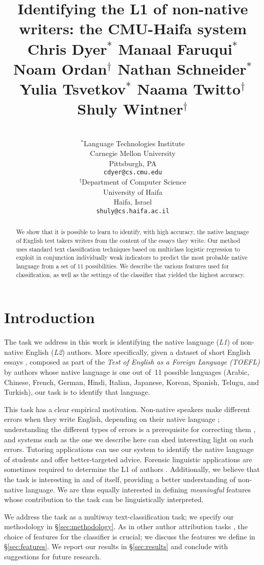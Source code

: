 \documentclass[11pt,letterpaper]{article}
\title{Identifying the L1 of non-native writers: the CMU-Haifa system\\[1em]
{\large Chris Dyer$^\ast$ Manaal Faruqui$^\ast$ Noam Ordan$^\dagger$ Nathan Schneider$^\ast$\\ Yulia Tsvetkov$^\ast$ Naama Twitto$^\dagger$ Shuly Wintner$^\dagger$}\\[-3em]
}
\author{
\\
$^\ast$Language Technologies Institute\\Carnegie Mellon University\\Pittsburgh, PA\\\texttt{cdyer@cs.cmu.edu}
\And
\\
$^\dagger$Department of Computer Science\\University of Haifa\\Haifa, Israel\\\texttt{shuly@cs.haifa.ac.il}
%
%
%
%
}
\date{}
\newcommand{\Sref}[1]{\S\ref{#1}}
\begin{document}
\maketitle
\begin{abstract}
We show that it is possible to learn to identify, with high accuracy, the native language of English test takers writers from the content of the essays they write.  Our method uses standard text classification
techniques based on multiclass logistic regression to exploit in conjunction individually weak indicators to predict the most probable native language from a set of 11 possibilities. We describe the various features
used for classification, as well as the settings of the classifier
that yielded the highest accuracy.
\end{abstract}

\section{Introduction}
\label{sec:intro}
The task we address in this work is identifying the native language
(\emph{L1}) of non-native English (\emph{L2}) authors. More specifically, given a
dataset of short English essays
\citep{blanchard-tetreault-higgins-cahill-chodorow:2013:TOEFL11-RR},
composed as part of the \emph{Test of English as a Foreign Language
  (TOEFL)} by authors whose native language is one out of~11 possible
languages (Arabic, Chinese, French, German, Hindi, Italian, Japanese,
Korean, Spanish, Telugu, and Turkish), our task is to identify that
language.

This task has a clear empirical motivation. Non-native speakers make
different errors when they write English, depending on their native
language \citep{swan2001learner}; understanding the different types of
errors is a prerequisite for correcting them
\citep{Leacock:2010:AGE:1855062}, and systems such as the one we
describe here can shed interesting light on such errors. Tutoring
applications can use our system to identify the native language of
students and offer better-targeted advice. Forensic linguistic
applications are sometimes required to determine the L1 of authors
\citep{estival-gaustad-pham-radford-hutchinson:2007:ALTA2007,estival2007author}. Additionally,
we believe that the task is interesting in and of itself, providing a
better understanding of non-native language. We are thus equally
interested in defining \emph{meaningful} features whose contribution
to the task can be linguistically interpreted.

We address the task as a multiway text-classification task; we specify
our methodology in \Sref{sec:methodology}. As in other author
attribution tasks \citep{joula:2006}, the choice of features for the
classifier is crucial; we discuss the features we define in
\Sref{sec:features}. We report our results in
\Sref{sec:results} and conclude with suggestions for future
research.
\end{document}
